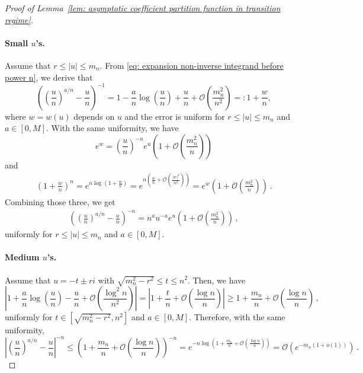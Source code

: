 \documentclass{article}
\theoremstyle{remark}
\newcommand{\cO}{\mathcal{O}}
\newcommand{\abs}[1]{{\left|#1\right|}}
\begin{document}
\begin{proof}[Proof of Lemma~\ref{lem: asymptotic coefficient partition function in transition regime}]
    \paragraph{Small $u$'s.}
    Assume that $r\le |u|\le m_n$.
    From \eqref{eq: expansion non-inverse integrand before power n}, we derive that
    \begin{equation*}
        \left( \left(\frac{u}{n}\right)^{a/n} - \frac{u}{n} \right)^{-1}
        = 1 - \frac{a}{n}\log\left(\frac{u}{n}\right) + \frac{u}{n} + \cO\left(\frac{m_n^2}{n^2}\right)
        =: 1 + \frac{w}{n},
    \end{equation*}
    where $w = w(u)$ depends on $u$ and the error is uniform for $r\le |u|\le m_n$ and $a\in[0,M]$.
    With the same uniformity, we have 
    \begin{equation*}
        e^w = \left(\frac{u}{n}\right)^{-a} e^u \left( 1 + \cO\left(\frac{m_n^2}{n}\right) \right)
    \end{equation*}
    and
    \begin{align*}
        \left( 1 + \frac{w}{n} \right)^n
        = e^{n\log\left(1+\frac{w}{n}\right)}
        = e^{n\left(\frac{w}{n} + \cO\left(\frac{|w|^2}{n^2}\right)\right)}
        = e^w \left( 1 + \cO\left(\frac{m_n^2}{n}\right) \right) \,.
    \end{align*}
    Combining those three, we get
    \begin{align}\label{eq: Hankel computation of A - uniform estimate small u}
        \left( \left(\frac{u}{n}\right)^{a/n} - \frac{u}{n} \right)^{-n}
        = n^a u^{-a} e^u  \left( 1 + \cO\left(\frac{m_n^2}{n}\right) \right)\,,
    \end{align}
    uniformly for $r\le |u|\le m_n$ and $a\in[0,M]$.
    
    \paragraph{Medium $u$'s.}
    Assume that $u = -t \pm ri$ with $\sqrt{m_n^2-r^2}\le t\le n^2$. 
    Then, we have
    \begin{equation*}
        \abs{ 1 + \frac{a}{n}\log\left(\frac{u}{n}\right) - \frac{u}{n} + \cO\left(\frac{\log^2n}{n^2}\right) }
        = \abs{ 1 + \frac{t}{n} + \cO\left(\frac{\log n}{n}\right) }
        \ge 1 + \frac{m_n}{n} + \cO\left(\frac{\log n}{n}\right)\,,
    \end{equation*}
    uniformly for $t \in [\sqrt{m_n^2-r^2},n^2]$ and $a\in[0,M]$.
    Therefore, with the same uniformity,
    \begin{equation}\label{eq: Hankel computation of A - uniform estimate medium u}
        \abs{ \left(\frac{u}{n}\right)^{a/n} - \frac{u}{n} }^{-n}
        \le \left( 1 + \frac{m_n}{n} + \cO\left(\frac{\log n}{n}\right) \right)^{-n}
        = e^{-n\log\left( 1 + \frac{m_n}{n} + \cO\left(\frac{\log n}{n}\right) \right)}
        = \cO\left( e^{-m_n(1+o(1))} \right) \,.
    \end{equation}
    

\end{proof}
\end{document}
